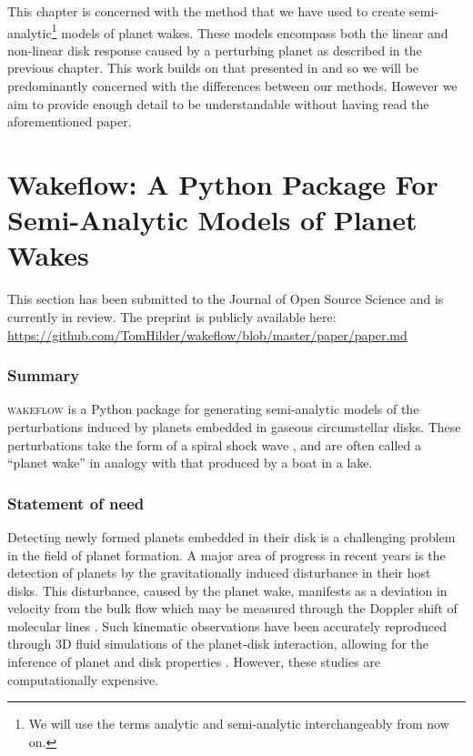 \setlength{\headheight}{13.59999pt}

This chapter is concerned with the method that we have used to create semi-analytic\footnote{We will use the terms analytic and semi-analytic interchangeably from now on.} models of planet wakes.
These models encompass both the linear and non-linear disk response caused by a perturbing planet as described in the previous chapter. 
This work builds on that presented in \citet{bollati2021} and so we will be predominantly concerned with the differences between our methods.
However we aim to provide enough detail to be understandable without having read the aforementioned paper.

\section{Wakeflow: A Python Package For Semi-Analytic Models of Planet Wakes} \label{sec:JOSS}

This section has been submitted to the Journal of Open Source Science and is currently in review. The preprint is publicly available here: \url{https://github.com/TomHilder/wakeflow/blob/master/paper/paper.md}

\subsubsection{Summary}

\textsc{wakeflow} is a Python package for generating semi-analytic models of the perturbations induced by planets embedded in gaseous circumstellar disks. 
These perturbations take the form of a spiral shock wave \citep{ogilvie2002}, and are often called a ``planet wake'' in analogy with that produced by a boat in a lake.

\subsubsection{Statement of need}

Detecting newly formed planets embedded in their disk is a challenging problem in the field of planet formation. 
A major area of progress in recent years is the detection of planets by the gravitationally induced disturbance in their host disks. 
This disturbance, caused by the planet wake, manifests as a deviation in velocity from the bulk flow which may be measured through the Doppler shift of molecular lines \citep[e.g.][]{perez2015, pinte2018a}. 
Such kinematic observations have been accurately reproduced through 3D fluid simulations of the planet-disk interaction, allowing for the inference of planet and disk properties \citep{pinte2018a, pinte2019}. 
However, these studies are computationally expensive.

